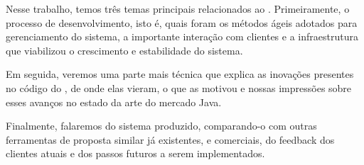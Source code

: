 Nesse trabalho, temos três temas principais relacionados ao \calopsita{}. Primeiramente, o processo de desenvolvimento, isto é, quais foram os métodos ágeis adotados para gerenciamento do sistema, a importante interação com clientes e a infraestrutura que viabilizou o crescimento e estabilidade do sistema. 

Em seguida, veremos uma parte mais técnica que explica as inovações presentes no código do \calopsita{}, de onde elas vieram, o que as motivou e nossas impressões sobre esses avanços no estado da arte do mercado Java.

Finalmente, falaremos do sistema produzido, comparando-o com outras ferramentas de proposta similar já existentes, \opensource{} e comerciais, do feedback dos clientes atuais e dos passos futuros a serem implementados.
